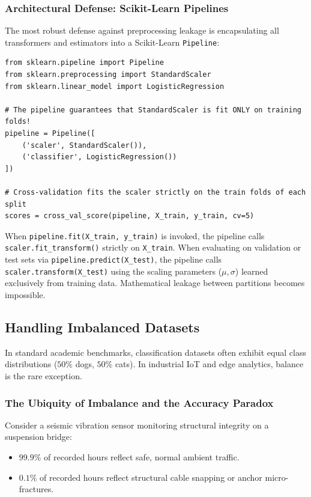 \subsubsection{Architectural Defense: Scikit-Learn Pipelines}
The most robust defense against preprocessing leakage is encapsulating all transformers and estimators into a Scikit-Learn \texttt{Pipeline}:
\begin{lstlisting}[style=pythonstyle]
from sklearn.pipeline import Pipeline
from sklearn.preprocessing import StandardScaler
from sklearn.linear_model import LogisticRegression

# The pipeline guarantees that StandardScaler is fit ONLY on training folds!
pipeline = Pipeline([
    ('scaler', StandardScaler()),
    ('classifier', LogisticRegression())
])

# Cross-validation fits the scaler strictly on the train folds of each split
scores = cross_val_score(pipeline, X_train, y_train, cv=5)
\end{lstlisting}
When \texttt{pipeline.fit(X\_train, y\_train)} is invoked, the pipeline calls \texttt{scaler.fit\_transform()} strictly on \texttt{X\_train}. When evaluating on validation or test sets via \texttt{pipeline.predict(X\_test)}, the pipeline calls \texttt{scaler.transform(X\_test)} using the scaling parameters ($\mu, \sigma$) learned exclusively from training data. Mathematical leakage between partitions becomes impossible.

\subsection{Handling Imbalanced Datasets}\label{subsec:handling_class_imbalance}

In standard academic benchmarks, classification datasets often exhibit equal class distributions ($50\%$ dogs, $50\%$ cats). In industrial IoT and edge analytics, balance is the rare exception.

\subsubsection{The Ubiquity of Imbalance and the Accuracy Paradox}
Consider a seismic vibration sensor monitoring structural integrity on a suspension bridge:
\begin{itemize}
    \item $99.9\%$ of recorded hours reflect safe, normal ambient traffic.
    \item $0.1\%$ of recorded hours reflect structural cable snapping or anchor micro-fractures.
\end{itemize}

